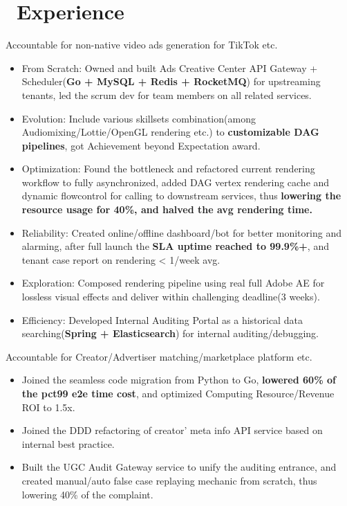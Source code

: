 \documentclass{resume}
\begin{document}
\section{\faUsers\ Experience}
Accountable for non-native video ads generation for TikTok etc.
\begin{itemize}
  \item From Scratch: Owned and built Ads Creative Center API Gateway + Scheduler(\textbf{Go + MySQL + Redis + RocketMQ}) for upstreaming tenants, led the scrum dev for team members on all related services.
  \item Evolution: Include various skillsets combination(among Audiomixing/Lottie/OpenGL rendering etc.) to \textbf{customizable DAG pipelines}, got Achievement beyond Expectation award.
  \item Optimization: Found the bottleneck and refactored current rendering workflow to fully asynchronized, added DAG vertex rendering cache and dynamic flowcontrol for calling to downstream services,
  thus \textbf{lowering the resource usage for 40\%, and halved the avg rendering time.}
  \item Reliability: Created online/offline dashboard/bot for better monitoring and alarming, 
  after full launch the \textbf{SLA uptime reached to 99.9\%+}, and tenant case report on rendering < 1/week avg.
  \item Exploration: Composed rendering pipeline using real full Adobe AE for lossless visual effects and deliver within challenging deadline(3 weeks).
  \item Efficiency: Developed Internal Auditing Portal as a historical data searching(\textbf{Spring + Elasticsearch}) for internal auditing/debugging.
\end{itemize}
{}
Accountable for Creator/Advertiser matching/marketplace platform etc.
\begin{itemize}
  \item Joined the seamless code migration from Python to Go, \textbf{lowered 60\% of the pct99 e2e time cost}, 
  and optimized Computing Resource/Revenue ROI to 1.5x.
  \item Joined the DDD refactoring of creator' meta info API service based on internal best practice. 
  \item Built the UGC Audit Gateway service to unify the auditing entrance, and created manual/auto false case replaying mechanic from scratch, thus lowering 40\% of the complaint.
\end{itemize}
\end{document}
